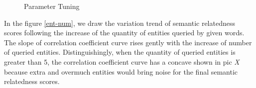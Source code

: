 \begin{figure}
    \centering
    \caption{Parameter Tuning}
\end{figure}


In the figure \ref{ent-num}, we draw the variation trend
of semantic relatedness scores following the increase of the quantity of entities queried by given words.
The slope of correlation coefficient curve rises gently with the increase of number of queried entities.
Distinguishingly, when the quantity of queried entities is greater than 5, the correlation coefficient
curve has a concave shown in pic \emph{X} because extra and overmuch entities would bring noise for the final
semantic relatedness scores.

